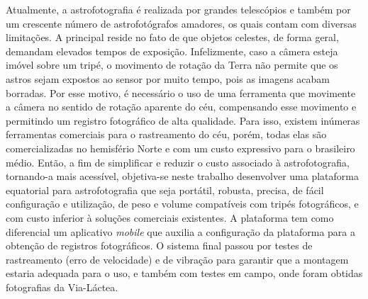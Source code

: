 Atualmente, a astrofotografia é realizada por grandes telescópios e também por um crescente número de astrofotógrafos amadores, os quais contam com diversas limitações. A principal reside no fato de que objetos celestes, de forma geral, demandam elevados tempos de exposição. Infelizmente, caso a câmera esteja imóvel sobre um tripé, o movimento de rotação da Terra não permite que os astros sejam expostos ao sensor por muito tempo, pois as imagens acabam borradas. Por esse motivo, é necessário o uso de uma ferramenta que movimente a câmera no sentido de rotação aparente do céu, compensando esse movimento e permitindo um registro fotográfico de alta qualidade. Para isso, existem inúmeras ferramentas comerciais para o rastreamento do céu, porém, todas elas são comercializadas no hemisfério Norte e com um custo expressivo para o brasileiro médio. Então, a fim de simplificar e reduzir o custo associado à astrofotografia, tornando-a mais acessível, objetiva-se neste trabalho desenvolver uma plataforma equatorial para astrofotografia que seja portátil, robusta, precisa, de fácil configuração e utilização, de peso e volume compatíveis com tripés fotográficos, e com custo inferior à soluções comerciais existentes. A plataforma tem como diferencial um aplicativo \textit{mobile} que auxilia a configuração da plataforma para a obtenção de registros fotográficos. O sistema final passou por testes de rastreamento (erro de velocidade) e de vibração para garantir que a montagem estaria adequada para o uso, e também com testes em campo, onde foram obtidas fotografias da Via-Láctea.

